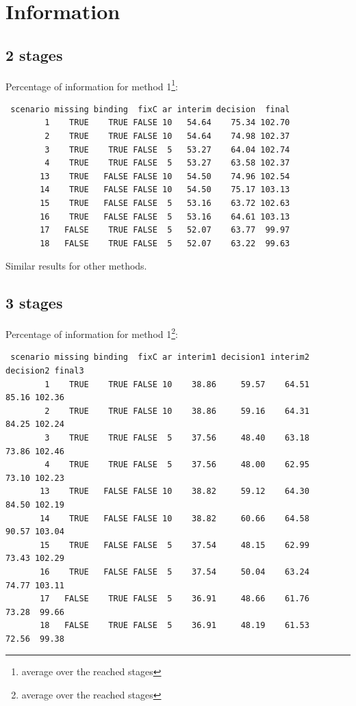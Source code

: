 \documentclass[12pt]{article}
\begin{document}
\clearpage

\section{Information}
\label{sec:org669653b}

\subsection{2 stages}
\label{sec:org14dbac4}
Percentage of information for method 1\footnote{average over the reached stages}:
\begin{verbatim}
 scenario missing binding  fixC ar interim decision  final
        1    TRUE    TRUE FALSE 10   54.64    75.34 102.70
        2    TRUE    TRUE FALSE 10   54.64    74.98 102.37
        3    TRUE    TRUE FALSE  5   53.27    64.04 102.74
        4    TRUE    TRUE FALSE  5   53.27    63.58 102.37
       13    TRUE   FALSE FALSE 10   54.50    74.96 102.54
       14    TRUE   FALSE FALSE 10   54.50    75.17 103.13
       15    TRUE   FALSE FALSE  5   53.16    63.72 102.63
       16    TRUE   FALSE FALSE  5   53.16    64.61 103.13
       17   FALSE    TRUE FALSE  5   52.07    63.77  99.97
       18   FALSE    TRUE FALSE  5   52.07    63.22  99.63
\end{verbatim}

Similar results for other methods.

\subsection{3 stages}
\label{sec:org5473da7}
Percentage of information for method 1\footnote{average over the reached stages}:
\begin{verbatim}
 scenario missing binding  fixC ar interim1 decision1 interim2 decision2 final3
        1    TRUE    TRUE FALSE 10    38.86     59.57    64.51     85.16 102.36
        2    TRUE    TRUE FALSE 10    38.86     59.16    64.31     84.25 102.24
        3    TRUE    TRUE FALSE  5    37.56     48.40    63.18     73.86 102.46
        4    TRUE    TRUE FALSE  5    37.56     48.00    62.95     73.10 102.23
       13    TRUE   FALSE FALSE 10    38.82     59.12    64.30     84.50 102.19
       14    TRUE   FALSE FALSE 10    38.82     60.66    64.58     90.57 103.04
       15    TRUE   FALSE FALSE  5    37.54     48.15    62.99     73.43 102.29
       16    TRUE   FALSE FALSE  5    37.54     50.04    63.24     74.77 103.11
       17   FALSE    TRUE FALSE  5    36.91     48.66    61.76     73.28  99.66
       18   FALSE    TRUE FALSE  5    36.91     48.19    61.53     72.56  99.38
\end{verbatim}
\end{document}
